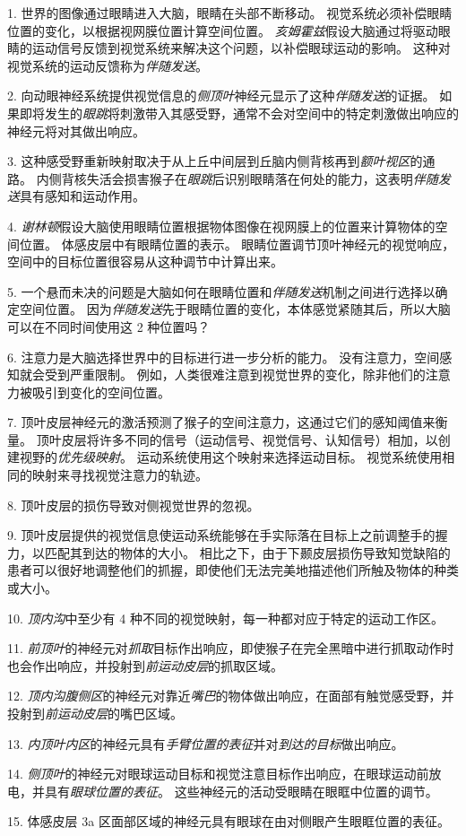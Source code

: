 1. 世界的图像通过眼睛进入大脑，眼睛在头部不断移动。
视觉系统必须补偿眼睛位置的变化，以根据视网膜位置计算空间位置。
\textit{亥姆霍兹}假设大脑通过将驱动眼睛的运动信号反馈到视觉系统来解决这个问题，以补偿眼球运动的影响。
这种对视觉系统的运动反馈称为\textit{伴随发送}。


2. 向动眼神经系统提供视觉信息的\textit{侧顶叶}神经元显示了这种\textit{伴随发送}的证据。
如果即将发生的\textit{眼跳}将刺激带入其感受野，通常不会对空间中的特定刺激做出响应的神经元将对其做出响应。


3. 这种感受野重新映射取决于从上丘中间层到丘脑内侧背核再到\textit{额叶视区}的通路。
内侧背核失活会损害猴子在\textit{眼跳}后识别眼睛落在何处的能力，这表明\textit{伴随发送}具有感知和运动作用。


4. \textit{谢林顿}假设大脑使用眼睛位置根据物体图像在视网膜上的位置来计算物体的空间位置。
体感皮层中有眼睛位置的表示。
眼睛位置调节顶叶神经元的视觉响应，空间中的目标位置很容易从这种调节中计算出来。


5. 一个悬而未决的问题是大脑如何在眼睛位置和\textit{伴随发送}机制之间进行选择以确定空间位置。
因为\textit{伴随发送}先于眼睛位置的变化，本体感觉紧随其后，所以大脑可以在不同时间使用这 2 种位置吗？


6. 注意力是大脑选择世界中的目标进行进一步分析的能力。
没有注意力，空间感知就会受到严重限制。
例如，人类很难注意到视觉世界的变化，除非他们的注意力被吸引到变化的空间位置。


7. 顶叶皮层神经元的激活预测了猴子的空间注意力，这通过它们的感知阈值来衡量。
顶叶皮层将许多不同的信号（运动信号、视觉信号、认知信号）相加，以创建视野的\textit{优先级映射}。
运动系统使用这个映射来选择运动目标。
视觉系统使用相同的映射来寻找视觉注意力的轨迹。


8. 顶叶皮层的损伤导致对侧视觉世界的忽视。


9. 顶叶皮层提供的视觉信息使运动系统能够在手实际落在目标上之前调整手的握力，以匹配其到达的物体的大小。
相比之下，由于下颞皮层损伤导致知觉缺陷的患者可以很好地调整他们的抓握，即使他们无法完美地描述他们所触及物体的种类或大小。


10. \textit{顶内沟}中至少有 4 种不同的视觉映射，每一种都对应于特定的运动工作区。


11. \textit{前顶叶}的神经元对\textit{抓取}目标作出响应，即使猴子在完全黑暗中进行抓取动作时也会作出响应，并投射到\textit{前运动皮层}的抓取区域。


12. \textit{顶内沟腹侧区}的神经元对靠近\textit{嘴巴}的物体做出响应，在面部有触觉感受野，并投射到\textit{前运动皮层}的嘴巴区域。 


13. \textit{内顶叶内区}的神经元具有\textit{手臂位置的表征}并对\textit{到达的目标}做出响应。


14. \textit{侧顶叶}的神经元对眼球运动目标和视觉注意目标作出响应，在眼球运动前放电，并具有\textit{眼球位置的表征}。
这些神经元的活动受眼睛在眼眶中位置的调节。


15. 体感皮层 3a 区面部区域的神经元具有眼球在由对侧眼产生眼眶位置的表征。

